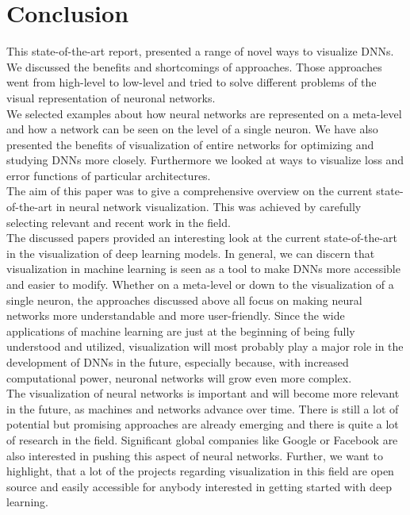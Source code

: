 \documentclass{acmsiggraph}               %
\begin{document}
\section{Conclusion}
This state-of-the-art report, presented a range of novel ways to visualize DNNs. We discussed the benefits and shortcomings of approaches. Those approaches went from high-level to low-level and tried to solve different problems of the visual representation of neuronal networks.\\
We selected examples about how neural networks are represented on a meta-level and how a network can be seen on the level of a single neuron. We have also presented the benefits of visualization of entire networks for optimizing and studying DNNs more closely. Furthermore we looked at ways to visualize loss and error functions of particular architectures.\\

The aim of this paper was to give a comprehensive overview on the current state-of-the-art in neural network visualization. This was achieved by carefully selecting relevant and recent work in the field.\\

The discussed papers provided an interesting look at the current state-of-the-art in the visualization of deep learning models. In general, we can discern that visualization in machine learning is seen as a tool to make DNNs more accessible and easier to modify. Whether on a meta-level or down to the visualization of a single neuron, the approaches discussed above all focus on making neural networks more understandable and more user-friendly. Since the wide applications of machine learning are just at the beginning of being fully understood and utilized, visualization will most probably play a major role in the development of DNNs in the future, especially because, with increased computational power, neuronal networks will grow even more complex.\\

The visualization of neural networks is important and will become more relevant in the future, as machines and networks advance over time. There is still a lot of potential but promising approaches are already emerging and there is quite a lot of research in the field. Significant global companies like Google or Facebook are also interested in pushing this aspect of neural networks. Further, we want to highlight, that a lot of the projects regarding visualization in this field are open source and easily accessible for anybody interested in getting started with deep learning. 
\end{document}
